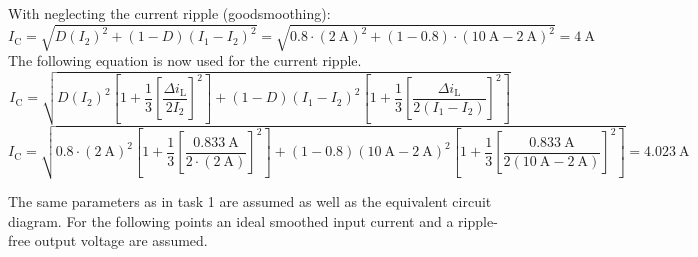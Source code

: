 \begin{solutionblock}
\begin{equation}
     \end{equation}
     With neglecting the current ripple (goodsmoothing):
     \begin{equation}
        I_\mathrm{C}=\sqrt{D (I_\mathrm{2})^2+(1-D)(I_\mathrm{1}-I_\mathrm{2})^2}=\sqrt{0.8\cdot (\SI{2}{\ampere})^2+(1-0.8)\cdot(\SI{10}{\ampere}-\SI{2}{\ampere})^2} = \SI{4}{\ampere}
     \end{equation}
     The following equation is now used for the current ripple.
     \begin{equation}
        I_\mathrm{C}=\sqrt{D (I_\mathrm{2})^2[1+\frac{1}{3}[\frac{\Delta i_\mathrm{L}}{2I_\mathrm{2}}]^2]+(1-D)(I_\mathrm{1}-I_\mathrm{2})^2[1+\frac{1}{3}[\frac{\Delta i_\mathrm{L}}{2(I_\mathrm{1}-I_\mathrm{2})}]^2]} 
    \end{equation}
    \begin{equation}
        I_\mathrm{C}=\sqrt{0.8 \cdot (\SI{2}{\ampere})^2 [1+\frac{1}{3}[\frac{\SI{0.833}{\ampere}}{2\cdot (\SI{2}{\ampere})}]^2]+(1-0.8)(\SI{10}{\ampere}- \SI{2}{\ampere})^2[1+\frac{1}{3}[\frac{\SI{0.833}{\ampere}}{2(\SI{10}{\ampere}- \SI{2}{\ampere})}]^2]}=\SI{4.023}{\ampere}
    \end{equation}
\end{solutionblock}

The same parameters as in task 1 are assumed as well as the equivalent circuit diagram. For the following points an ideal smoothed input current and a ripple-free output voltage are assumed.

